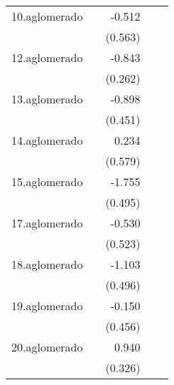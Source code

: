 {\begin{longtable}{l*{4}{D{.}{.}{-1}}}
\addlinespace
10.aglomerado&                     &      -0.512         &                     &                     \\
            &                     &     (0.563)         &                     &                     \\
\addlinespace
12.aglomerado&                     &      -0.843\sym{**} &                     &                     \\
            &                     &     (0.262)         &                     &                     \\
\addlinespace
13.aglomerado&                     &      -0.898\sym{*}  &                     &                     \\
            &                     &     (0.451)         &                     &                     \\
\addlinespace
14.aglomerado&                     &       0.234         &                     &                     \\
            &                     &     (0.579)         &                     &                     \\
\addlinespace
15.aglomerado&                     &      -1.755\sym{***}&                     &                     \\
            &                     &     (0.495)         &                     &                     \\
\addlinespace
17.aglomerado&                     &      -0.530         &                     &                     \\
            &                     &     (0.523)         &                     &                     \\
\addlinespace
18.aglomerado&                     &      -1.103\sym{*}  &                     &                     \\
            &                     &     (0.496)         &                     &                     \\
\addlinespace
19.aglomerado&                     &      -0.150         &                     &                     \\
            &                     &     (0.456)         &                     &                     \\
\addlinespace
20.aglomerado&                     &       0.940\sym{**} &                     &                     \\
            &                     &     (0.326)         &                     &                     \\

\end{longtable}}
